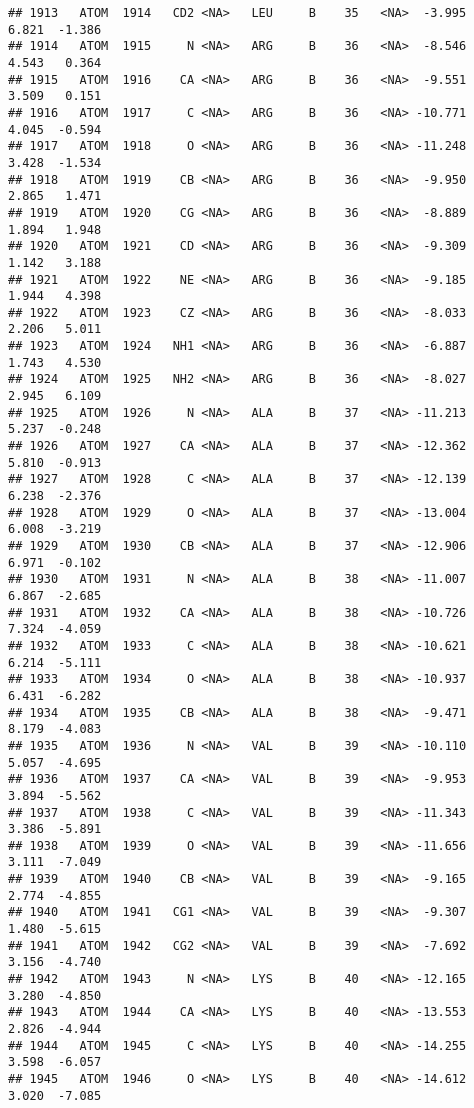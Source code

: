 \documentclass[
]{article}
\begin{document}
\begin{verbatim}
## 1913   ATOM  1914   CD2 <NA>   LEU     B    35   <NA>  -3.995   6.821  -1.386
## 1914   ATOM  1915     N <NA>   ARG     B    36   <NA>  -8.546   4.543   0.364
## 1915   ATOM  1916    CA <NA>   ARG     B    36   <NA>  -9.551   3.509   0.151
## 1916   ATOM  1917     C <NA>   ARG     B    36   <NA> -10.771   4.045  -0.594
## 1917   ATOM  1918     O <NA>   ARG     B    36   <NA> -11.248   3.428  -1.534
## 1918   ATOM  1919    CB <NA>   ARG     B    36   <NA>  -9.950   2.865   1.471
## 1919   ATOM  1920    CG <NA>   ARG     B    36   <NA>  -8.889   1.894   1.948
## 1920   ATOM  1921    CD <NA>   ARG     B    36   <NA>  -9.309   1.142   3.188
## 1921   ATOM  1922    NE <NA>   ARG     B    36   <NA>  -9.185   1.944   4.398
## 1922   ATOM  1923    CZ <NA>   ARG     B    36   <NA>  -8.033   2.206   5.011
## 1923   ATOM  1924   NH1 <NA>   ARG     B    36   <NA>  -6.887   1.743   4.530
## 1924   ATOM  1925   NH2 <NA>   ARG     B    36   <NA>  -8.027   2.945   6.109
## 1925   ATOM  1926     N <NA>   ALA     B    37   <NA> -11.213   5.237  -0.248
## 1926   ATOM  1927    CA <NA>   ALA     B    37   <NA> -12.362   5.810  -0.913
## 1927   ATOM  1928     C <NA>   ALA     B    37   <NA> -12.139   6.238  -2.376
## 1928   ATOM  1929     O <NA>   ALA     B    37   <NA> -13.004   6.008  -3.219
## 1929   ATOM  1930    CB <NA>   ALA     B    37   <NA> -12.906   6.971  -0.102
## 1930   ATOM  1931     N <NA>   ALA     B    38   <NA> -11.007   6.867  -2.685
## 1931   ATOM  1932    CA <NA>   ALA     B    38   <NA> -10.726   7.324  -4.059
## 1932   ATOM  1933     C <NA>   ALA     B    38   <NA> -10.621   6.214  -5.111
## 1933   ATOM  1934     O <NA>   ALA     B    38   <NA> -10.937   6.431  -6.282
## 1934   ATOM  1935    CB <NA>   ALA     B    38   <NA>  -9.471   8.179  -4.083
## 1935   ATOM  1936     N <NA>   VAL     B    39   <NA> -10.110   5.057  -4.695
## 1936   ATOM  1937    CA <NA>   VAL     B    39   <NA>  -9.953   3.894  -5.562
## 1937   ATOM  1938     C <NA>   VAL     B    39   <NA> -11.343   3.386  -5.891
## 1938   ATOM  1939     O <NA>   VAL     B    39   <NA> -11.656   3.111  -7.049
## 1939   ATOM  1940    CB <NA>   VAL     B    39   <NA>  -9.165   2.774  -4.855
## 1940   ATOM  1941   CG1 <NA>   VAL     B    39   <NA>  -9.307   1.480  -5.615
## 1941   ATOM  1942   CG2 <NA>   VAL     B    39   <NA>  -7.692   3.156  -4.740
## 1942   ATOM  1943     N <NA>   LYS     B    40   <NA> -12.165   3.280  -4.850
## 1943   ATOM  1944    CA <NA>   LYS     B    40   <NA> -13.553   2.826  -4.944
## 1944   ATOM  1945     C <NA>   LYS     B    40   <NA> -14.255   3.598  -6.057
## 1945   ATOM  1946     O <NA>   LYS     B    40   <NA> -14.612   3.020  -7.085

\end{verbatim}
\end{document}
